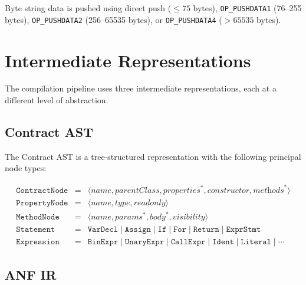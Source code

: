 \documentclass[11pt,a4paper]{article}
\newcommand{\op}[1]{\texttt{OP\_#1}}
\begin{document}
Byte string data is pushed using direct push ($\leq 75$ bytes),
\op{PUSHDATA1} (76--255 bytes), \op{PUSHDATA2} (256--65535 bytes),
or \op{PUSHDATA4} ($> 65535$ bytes).

\section{Intermediate Representations}
\label{sec:ir}

The compilation pipeline uses three intermediate representations, each at a
different level of abstraction.

\subsection{Contract AST}
\label{sec:ir-ast}

The Contract AST is a tree-structured representation with the following
principal node types:

\[
\begin{array}{rcl}
\texttt{ContractNode} &=& \langle \textit{name}, \textit{parentClass}, \textit{properties}^*, \textit{constructor}, \textit{methods}^* \rangle \\
\texttt{PropertyNode} &=& \langle \textit{name}, \textit{type}, \textit{readonly} \rangle \\
\texttt{MethodNode} &=& \langle \textit{name}, \textit{params}^*, \textit{body}^*, \textit{visibility} \rangle \\
\texttt{Statement} &=& \texttt{VarDecl} \mid \texttt{Assign} \mid \texttt{If} \mid \texttt{For} \mid \texttt{Return} \mid \texttt{ExprStmt} \\
\texttt{Expression} &=& \texttt{BinExpr} \mid \texttt{UnaryExpr} \mid \texttt{CallExpr} \mid \texttt{Ident} \mid \texttt{Literal} \mid \cdots
\end{array}
\]

\subsection{ANF IR}
\label{sec:ir-anf}
\end{document}
